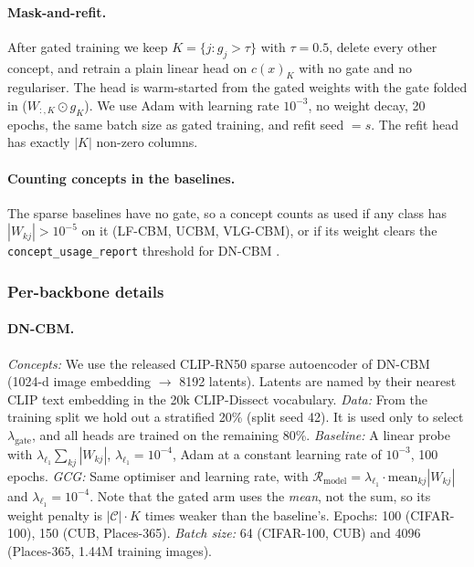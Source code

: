 \paragraph{Mask-and-refit.}
After gated training we keep $K=\{j: g_j>\tau\}$ with $\tau=0.5$, delete every other
concept, and retrain a plain linear head on $c(x)_K$ with no gate and no regulariser. The head
is warm-started from the gated weights with the gate folded in ($W_{:,K}\odot g_K$). We use
Adam with learning rate $10^{-3}$, no weight decay, 20 epochs, the same batch size as gated
training, and refit seed $=s$. The refit head has exactly $|K|$ non-zero columns.

\paragraph{Counting concepts in the baselines.}
The sparse baselines have no gate, so a concept counts as used if any class has
$|W_{kj}|>10^{-5}$ on it (LF-CBM, UCBM, VLG-CBM), or if its weight clears the
\texttt{concept\_usage\_report} threshold for DN-CBM .

\subsubsection{Per-backbone details}

\paragraph{DN-CBM.}
\emph{Concepts:} We use the released CLIP-RN50 sparse autoencoder of DN-CBM (1024-d image
embedding $\to$ 8192 latents). Latents are named by their nearest CLIP text embedding in the
20k CLIP-Dissect vocabulary. \emph{Data:} From the training split we hold out a stratified 20\%
(split seed 42). It is used only to select $\lambda_{\text{gate}}$, and all heads are trained
on the remaining 80\%.
\emph{Baseline:} A linear probe with $\lambda_{\ell_1}\sum_{kj}|W_{kj}|$, $\lambda_{\ell_1}=10^{-4}$,
Adam at a constant learning rate of $10^{-3}$, 100 epochs.
\emph{GCG:} Same optimiser and learning rate, with $\mathcal{R}_{\text{model}}=\lambda_{\ell_1}\cdot
\mathrm{mean}_{kj}|W_{kj}|$ and $\lambda_{\ell_1}=10^{-4}$. Note that the gated arm uses the
\emph{mean}, not the sum, so its weight penalty is $|\mathcal{C}|\cdot K$ times weaker than
the baseline's. Epochs: 100 (CIFAR-100), 150 (CUB, Places-365).
\emph{Batch size:} 64 (CIFAR-100, CUB) and 4096 (Places-365, 1.44M training images).

